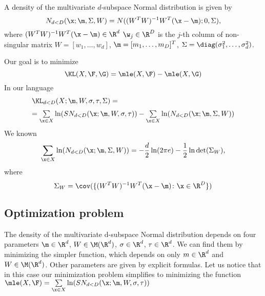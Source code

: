 \begin{definition}\label{def:GSN}
A density of the multivariate $d$-subspace Normal distribution is given by
$$
 N_{d<D}(\x; \m, \Sigma, W)= N((W^TW)^{-1}W^T(\x-\m);0,\Sigma),
$$
where
$(W^TW)^{-1}W^T(\x-\m) \in \R^d$
 $\w_{j} \in \R^D$ is the $j$-th column of non-singular matrix $W = [w_{1},\ldots,w_{d}]$, $\m = [m_1, \ldots, m_D]^T$, $\Sigma = \diag(\sigma_{1}^2,\ldots,\sigma_{d}^2)$.
\end{definition}

Our goal is to minimize
$$
\KL(X,\F,\G)=\mle(X,\F)-\mle(X,\G) 
$$
In our language
\begin{equation}
\begin{array}{l}
\KL_{d<D}(X;\m,W,\sigma,\tau,\Sigma) = \\[6pt]
= \sum \limits_{\x \in X} \ln(SN_{d<D}(\x;\m,W,\sigma,\tau)) -
   \sum \limits_{\x \in X} \ln(N_{d<D}(\x;\m,\Sigma,W))
\end{array}
\end{equation}
We known
$$
\sum \limits_{\x \in X} \ln(N_{d<D}(\x;\m,\Sigma,W)) = -\frac{d}{2}\ln(2\pi e)-\frac{1}{2}\ln \det(\Sigma_{W}), 
$$
where 
$$
\Sigma_{W} = \cov( \{ (W^TW)^{-1}W^T(\x-\m) \colon \x \in \R^D\} )
$$

\subsection{Optimization problem}

The density of the multivariate d-subspace Normal distribution depends on four parameters $\m \in \R^d$, $W \in \M(\R^d)$, $\sigma \in \R^d$, $\tau \in \R^d$. 
We can find them by minimizing the simpler function, which depends on only  $m \in \R^d$ and $W \in \M(\R^d)$. Other parameters are given by explicit formulas. Let us notice that in this case our minimization problem simplifies to minimizing the function $\mle(X,\F) = \sum \limits_{\x \in X} \ln(SN_{d<D}(\x;\m,W,\sigma,\tau))$


